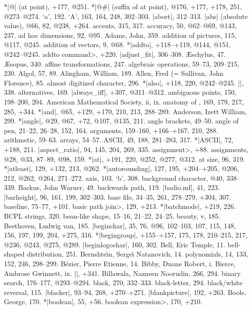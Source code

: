 *|@| (at point), +177, @251.
*|@#| (suffix of at point), @176, +177, +178, 251, @273--@274.
\newletter
`a', 192.
`A', 163, 164, 248, 302--303.
|abort|, 312--313.
|abs| (absolute value), @66, 82, @238, +264.
accents, 315, 317.
accuracy, 50, @62--@69, @143, 237.
ad hoc dimensions, 92, @95.
Adams, John, 359.
addition of pictures, 115, @117, @245.
addition of vectors, 9, @68.
*|addto|, +118--+119, @144, @151, @242--@245.
\<addto command>, +220.
|adjust_fit|, 306--308.
{\AE}schylus, 47.
{\AE}sopus, 340.
affine transformations, 247.
algebraic operations, 59--73, 209--215, 230.
Algol, 57, 89.
Alingham, William, 189.
Allen, Fred (= Sullivan, John Florence), 85.
almost digitized character, 296.
*|also|, +118, 220, @242--@245.
|\alternation|, 338.
alternatives, 169.
|always_iff|, +307, @311--@312.
ambiguous points, 150, 198--200, 204.
American Mathematical Society, ii, ix.
anatomy of \MF, 169, 179, 217, 285, +344.
*|and|, @65, +129, +170, 210, 213, 288--289.
Anderson, Izett William, 299.
*|angle|, @29, @67, +72, @107, @135, 211.
angle brackets, 49--50.
angle of pen, 21--22, 26--28, 152, 164.
arguments, 159--160, +166--+167, 210, 288.
arithmetic, 59--63.
arrays, 54--57.
ASCII, 49, 188, 281--283, 317.
*|ASCII|, 72, +188, 211.
|aspect_ratio|, 94, 145, 204, 269, 335.
\<assignment>, +88.
assignments, @28, @33, 87--89, @98, 159.
*|at|, +191, 220, @252, @277, @312.
at size, 96, 319.
*|atleast|, 129, +132, 213, @262.
*|autorounding|, 127, 195, +204--+205, @206, 212, @262, @264, 271--272.
axis, 103.
\newletter
`b', 308.
background character, @40, 338--339.
Backus, John Warner, 49.
backwards path, 119.
|badio.mf|, 41, 223.
|barheight|, 96, 161, 199, 302--303.
base file, 34--35, 261, 278--279, +304, 307.
baseline, 75--77, +101.
\<basic path join>, 129, +213.
*|batchmode|, +219, 226.
BCPL strings, 320.
bean-like shape, 15--16, 21--22, 24--25.
beauty, v, 185.
Beethoven, Ludwig van, 185.
|beginchar|, 35, 76, @96, 102--103, 107, 115, 148, 156, 197, 199, 204,
 +275, 316.
*|begingroup|, +155--+157, 175, 178, 210--215, 217, @236, @243, @275, @289.
|beginlogochar|, 160, 302.
Bell, Eric Temple, 11.
bell-shaped distribution, 251.
Bernshte{\u\i}n, Serge{\u\i} \thinspace Natanovich, 14.
\sub polynomials, 14, 133, 152, 246, 298--299.
B\'ezier, Pierre Etienne, 14.
Bibby, Duane Robert, i.
Bierce, Ambrose Gwinnett, ix.
|\bigtest|, +341.
Billawala, Nazneen Noorudin, 266, 294.
binary search, 176--177, @293--@294.
black, 270, 332--333.
black-letter, 294.
black/white reversal, 115.
|blacker|, 93--94, 268, +270--+271.
|blankpicture|, 192, +263.
Boole, George, 170.
*|boolean|, 55, +56.
\<boolean expression>, 170, +210.
